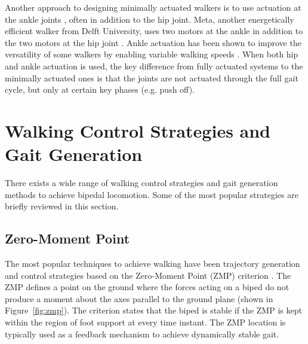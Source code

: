 Another approach to designing minimally actuated walkers is to use actuation at the ankle joints \cite{Collins:2005vp,Kuo:2002wk,Hobbelen2008Ankle,Hobbelen2008Controlling}, often in addition to the hip joint. Meta, another energetically efficient walker from Delft University, uses two motors at the ankle in addition to the two motors at the hip joint \cite{Hobbelen2008Ankle}. Ankle actuation has been shown to improve the versatility of some walkers by enabling variable walking speeds \cite{Hobbelen2008Controlling}. When both hip and ankle actuation is used, the key difference from fully actuated systems to the minimally actuated ones is that the joints are not actuated through the full gait cycle, but only at certain key phases (e.g. push off).









\section{Walking Control Strategies and Gait Generation} %
\label{sec:related_control_strategies}
There exists a wide range of walking control strategies and gait generation methods to achieve bipedal locomotion. Some of the most popular strategies are briefly reviewed in this section.


\subsection{Zero-Moment Point} %
\label{sub:related_zero_moment_point}
The most popular techniques to achieve walking have been trajectory generation and control strategies based on the Zero-Moment Point (ZMP) criterion \cite{Vukobratovic:2004wy}. The ZMP defines a point on the ground where the forces acting on a biped do not produce a moment about the axes parallel to the ground plane (shown in Figure~\ref{fig:zmp}). The criterion states that the biped is stable if the ZMP is kept within the region of foot support at every time instant. The ZMP location is typically used as a feedback mechanism to achieve dynamically stable gait.  

